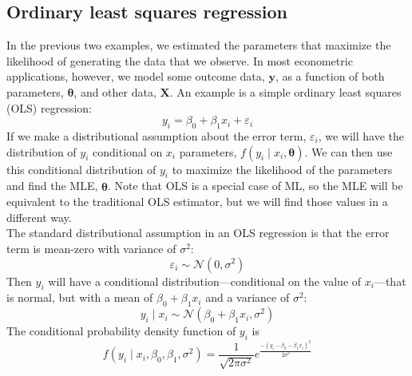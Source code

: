 \documentclass[11pt,letterpaper]{article}
\begin{document}
\subsection{Ordinary least squares regression}

In the previous two examples, we estimated the parameters that maximize the likelihood of generating the data that we observe. In most econometric applications, however, we model some outcome data, $\bm{y}$, as a function of both parameters, $\bm{\theta}$, and other data, $\bm{X}$. An example is a simple ordinary least squares (OLS) regression:
$$y_i = \beta_0 + \beta_1 x_i + \varepsilon_i$$
If we make a distributional assumption about the error term, $\varepsilon_i$, we will have the distribution of $y_i$ conditional on $x_i$ parameters, $f(y_i \mid x_i, \bm{\theta})$. We can then use this conditional distribution of $y_i$ to maximize the likelihood of the parameters and find the MLE, $\widehat{\bm{\theta}}$. Note that OLS is a special case of ML, so the MLE will be equivalent to the traditional OLS estimator, but we will find those values in a different way. \\

\noindent The standard distributional assumption in an OLS regression is that the error term is mean-zero with variance of $\sigma^2$:
$$\varepsilon_i \sim \mathcal{N}(0, \sigma^2)$$
Then $y_i$ will have a conditional distribution---conditional on the value of $x_i$---that is normal, but with a mean of $\beta_0 + \beta_1 x_i$ and a variance of $\sigma^2$:
$$y_i \mid x_i \sim \mathcal{N}(\beta_0 + \beta_1 x_i, \sigma^2)$$
The conditional probability density function of $y_i$ is
$$f(y_i \mid x_i, \beta_0, \beta_1, \sigma^2) = \frac{1}{\sqrt{2 \pi \sigma^2}} e^{\frac{-(y_i - \beta_0 - \beta_1 x_i)^2}{2 \sigma^2}}$$
\end{document}
